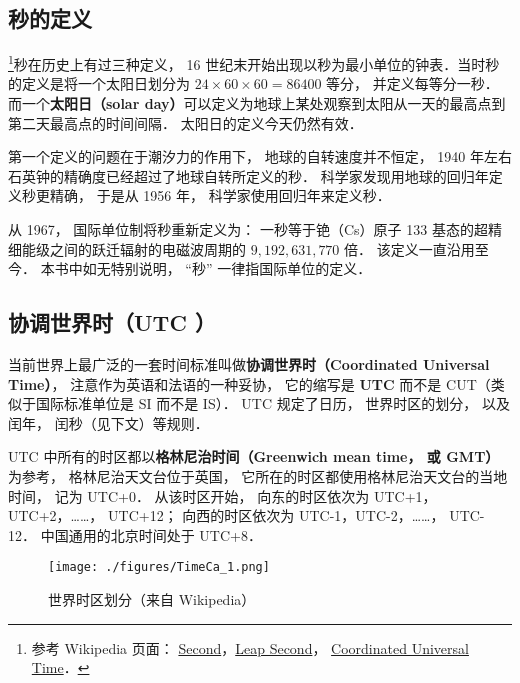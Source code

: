 
\begin{issues}
\end{issues}

\subsection{秒的定义}
\footnote{参考 Wikipedia 页面： \href{https://en.wikipedia.org/wiki/Second}{Second}，\href{https://en.wikipedia.org/wiki/Leap_second}{Leap Second}， \href{https://en.wikipedia.org/wiki/Coordinated_Universal_Time}{Coordinated Universal Time}．}秒在历史上有过三种定义， 16 世纪末开始出现以秒为最小单位的钟表．当时秒的定义是将一个太阳日划分为 $24\times60\times60 = 86400$ 等分， 并定义每等分一秒． 而一个\textbf{太阳日（solar day）}可以定义为地球上某处观察到太阳从一天的最高点到第二天最高点的时间间隔． 太阳日的定义今天仍然有效．

第一个定义的问题在于潮汐力的作用下， 地球的自转速度并不恒定， 1940 年左右石英钟的精确度已经超过了地球自转所定义的秒． 科学家发现用地球的回归年定义秒更精确， 于是从 1956 年， 科学家使用回归年来定义秒．

从 1967， 国际单位制将秒重新定义为： 一秒等于铯（Cs）原子 133 基态的超精细能级之间的跃迁辐射的电磁波周期的 $9,192,631,770$ 倍． 该定义一直沿用至今． 本书中如无特别说明， “秒” 一律指国际单位的定义．

\subsection{协调世界时（UTC ）}
当前世界上最广泛的一套时间标准叫做\textbf{协调世界时（Coordinated Universal Time）}， 注意作为英语和法语的一种妥协， 它的缩写是 \textbf{UTC} 而不是 CUT（类似于国际标准单位是 SI 而不是 IS）． UTC 规定了日历， 世界时区的划分， 以及闰年， 闰秒（见下文）等规则．

UTC 中所有的时区都以\textbf{格林尼治时间（Greenwich mean time， 或 GMT）} 为参考， 格林尼治天文台位于英国， 它所在的时区都使用格林尼治天文台的当地时间， 记为 UTC+0． 从该时区开始， 向东的时区依次为 UTC+1， UTC+2，……， UTC+12； 向西的时区依次为 UTC-1，UTC-2，……， UTC-12． 中国通用的北京时间处于 UTC+8．

\begin{figure}[ht]
\centering
\texttt{[image: ./figures/TimeCa\_1.png]}
\caption{世界时区划分（来自 Wikipedia）} \label{TimeCa_fig1}
\end{figure}

